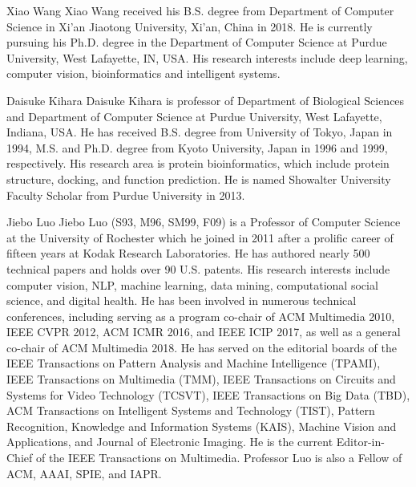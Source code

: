 \documentclass[journal]{IEEEtran}
\begin{document}
\ifCLASSOPTIONcaptionsoff
  \newpage
\fi















\begin{IEEEbiography}{Xiao Wang}
Xiao Wang received his B.S. degree from Department of Computer Science in Xi’an Jiaotong University, Xi’an, China in 2018. He is currently pursuing his Ph.D. degree in the Department of Computer Science at Purdue University, West Lafayette, IN, USA. His research interests include deep learning, computer vision, bioinformatics and intelligent systems.
\end{IEEEbiography}

\begin{IEEEbiography}{Daisuke Kihara}
Daisuke Kihara is professor of Department of Biological Sciences and Department of Computer Science at Purdue University, West Lafayette, Indiana, USA. He has received B.S.
degree from University of Tokyo, Japan in 1994, M.S. and
Ph.D. degree from Kyoto University, Japan in 1996 and 1999, respectively. His research area is protein bioinformatics, which include
protein structure, docking, and function prediction. He
is named Showalter University Faculty Scholar from
Purdue University in 2013.
\end{IEEEbiography}

\begin{IEEEbiography}{Jiebo Luo}
Jiebo Luo (S93, M96, SM99, F09) is a Professor of Computer Science at the University of Rochester which he joined in 2011 after a prolific career of fifteen years at Kodak Research Laboratories. He has authored nearly 500 technical papers and holds over 90 U.S. patents. His research interests include computer vision, NLP, machine learning, data mining, computational social science, and digital health. He has been involved in numerous technical conferences, including serving as a program co-chair of ACM Multimedia 2010, IEEE CVPR 2012, ACM ICMR 2016, and IEEE ICIP 2017, as well as a general co-chair of ACM Multimedia 2018. He has served on the editorial boards of the IEEE Transactions on Pattern Analysis and Machine Intelligence (TPAMI), IEEE Transactions on Multimedia (TMM), IEEE Transactions on Circuits and Systems for Video Technology (TCSVT), IEEE Transactions on Big Data (TBD), ACM Transactions on Intelligent Systems and Technology (TIST), Pattern Recognition, Knowledge and Information Systems (KAIS), Machine Vision and Applications, and Journal of Electronic Imaging. He is the current Editor-in-Chief of the IEEE Transactions on Multimedia. Professor Luo is also a Fellow of ACM, AAAI, SPIE, and IAPR.
\end{IEEEbiography}
\end{document}
